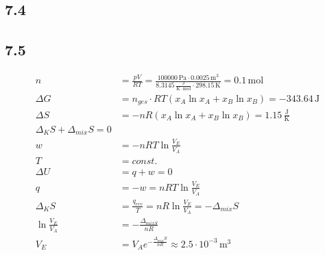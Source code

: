 \documentclass{article}
\begin{document}
\subsection*{7.4}

\subsection*{7.5}
\begin{align*}
    n&=\frac{pV}{RT}=\frac{100000\,\mathrm{Pa}\cdot 0.0025\,\mathrm{m^3}}{8.3145\,\mathrm{\frac{J}{K\cdot mol}} \cdot 298.15\,\mathrm{K}} = 0.1\,\mathrm{mol}\\
    \Delta G &= n_{ges} \cdot RT(x_A\ln x_A + x_B \ln x_B) = -343.64\,\mathrm{J}\\
    \Delta S &= -nR(x_A\ln x_A + x_B \ln x_B) = 1.15\,\mathrm{\frac{J}{K}}\\
    \Delta_KS + \Delta_{mix}S = 0\\
    w &= -nRT\ln\frac{V_E}{V_A}\\
    T &= const.\\
    \Delta U &= q+w = 0\\
    q &= -w = nRT\ln\frac{V_E}{V_A}\\
    \Delta_K S &= \frac{q_{rev}}{T} = nR\ln\frac{V_E}{V_A} = -\Delta_{mix}S\\
    \ln \frac{V_E}{V_A} &= -\frac{\Delta_{mix S}}{nR}\\
    V_E &= V_A e^{-\frac{\Delta_{mix}S}{nR}} \approx 2.5\cdot 10^{-3}\,\mathrm{m^3}
\end{align*}
\end{document}
